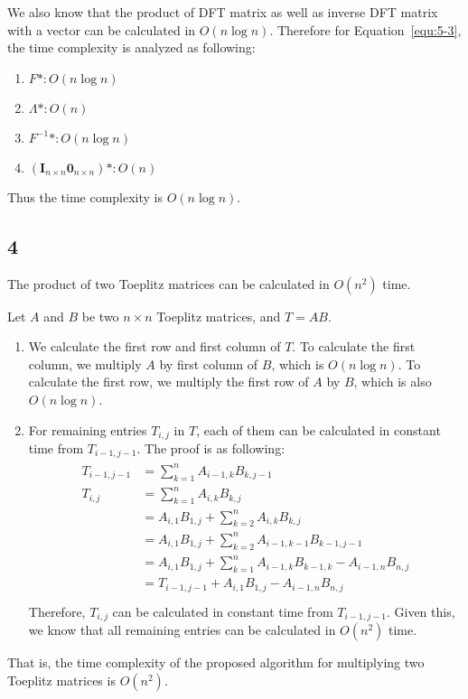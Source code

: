 \documentclass[paper=a4, fontsize=11pt]{scrartcl} %
\numberwithin{equation}{section} %
\numberwithin{figure}{section} %
\numberwithin{table}{section} %
\numberwithin{claimcounter}{section}
\begin{document}
We also know that the product of DFT matrix as well as inverse DFT matrix with a vector can be calculated in 
$O(n\log n)$. Therefore for Equation~\ref{equ:5-3}, the time complexity is
analyzed as following:
\begin{enumerate}
  \item $F *: O(n\log n)$
  \item $\Lambda *: O(n) $
  \item $F^{-1} *: O(n\log n) $
  \item $(\mathbf{I}_{n\times n} \mathbf{0}_{n\times n}) * : O(n) $
\end{enumerate}
Thus the time complexity is $O(n\log n)$.

\subsection*{4}
The product of two Toeplitz matrices can be calculated in $O(n^2)$ time.

Let $A$ and $B$ be two $n\times n$ Toeplitz matrices, and $T = AB$. 
\begin{enumerate}
  \item We calculate the first row and first column of $T$. To calculate the
    first column, we multiply $A$ by first column of $B$, which is $O(n\log n)$.
    To calculate the first row, we multiply the first row of $A$ by $B$, which
    is also $O(n\log n)$.
  \item For remaining entries $T_{i,j}$ in $T$, each of them can be calculated in constant 
    time from $T_{i-1, j-1}$. The proof is as following:
      \begin{align}
        \begin{split}
          T_{i-1, j-1} &= \sum_{k=1}^{n} A_{i-1, k} B_{k,j-1} \\
          T_{i, j} &= \sum_{k=1}^{n} A_{i, k} B_{k, j} \\
                &= A_{i,1}B_{1,j} + \sum_{k=2}^{n} A_{i, k} B_{k, j} \\
                &= A_{i,1}B_{1,j} + \sum_{k=2}^n A_{i-1, k-1} B_{k-1, j-1} \\
                &= A_{i,1}B_{1,j} + \sum_{k=1}^n A_{i-1, k} B_{k-1, k} -
                A_{i-1, n}B_{n,j} \\
                &= T_{i-1, j-1} + A_{i,1}B_{1,j} - A_{i-1, n}B_{n,j} \\
        \end{split}
      \end{align}
    Therefore, $T_{i, j}$ can be calculated in constant time from $T_{i-1,j-1}$.
    Given this, we know that all remaining entries can be calculated in $O(n^2)$
    time.
\end{enumerate}
That is, the time complexity of the proposed algorithm for multiplying two
Toeplitz matrices is $O(n^2)$.
\end{document}
